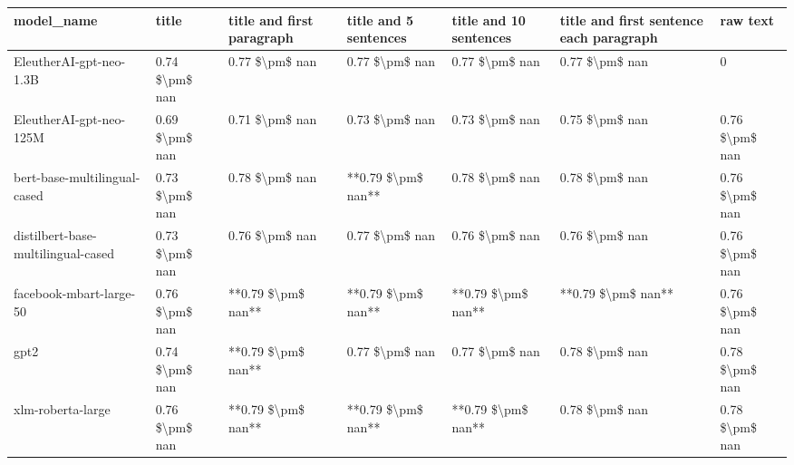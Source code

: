 \begin{tabular}{lllllll}
\toprule
                        model\_name &          title & title and first paragraph & title and 5 sentences & title and 10 sentences & title and first sentence each paragraph &       raw text \\
\midrule
           EleutherAI-gpt-neo-1.3B & 0.74 \$\textbackslash pm\$ nan &            0.77 \$\textbackslash pm\$ nan &        0.77 \$\textbackslash pm\$ nan &         0.77 \$\textbackslash pm\$ nan &                          0.77 \$\textbackslash pm\$ nan &              0 \\
           EleutherAI-gpt-neo-125M & 0.69 \$\textbackslash pm\$ nan &            0.71 \$\textbackslash pm\$ nan &        0.73 \$\textbackslash pm\$ nan &         0.73 \$\textbackslash pm\$ nan &                          0.75 \$\textbackslash pm\$ nan & 0.76 \$\textbackslash pm\$ nan \\
      bert-base-multilingual-cased & 0.73 \$\textbackslash pm\$ nan &            0.78 \$\textbackslash pm\$ nan &    **0.79 \$\textbackslash pm\$ nan** &         0.78 \$\textbackslash pm\$ nan &                          0.78 \$\textbackslash pm\$ nan & 0.76 \$\textbackslash pm\$ nan \\
distilbert-base-multilingual-cased & 0.73 \$\textbackslash pm\$ nan &            0.76 \$\textbackslash pm\$ nan &        0.77 \$\textbackslash pm\$ nan &         0.76 \$\textbackslash pm\$ nan &                          0.76 \$\textbackslash pm\$ nan & 0.76 \$\textbackslash pm\$ nan \\
           facebook-mbart-large-50 & 0.76 \$\textbackslash pm\$ nan &        **0.79 \$\textbackslash pm\$ nan** &    **0.79 \$\textbackslash pm\$ nan** &     **0.79 \$\textbackslash pm\$ nan** &                      **0.79 \$\textbackslash pm\$ nan** & 0.76 \$\textbackslash pm\$ nan \\
                              gpt2 & 0.74 \$\textbackslash pm\$ nan &        **0.79 \$\textbackslash pm\$ nan** &        0.77 \$\textbackslash pm\$ nan &         0.77 \$\textbackslash pm\$ nan &                          0.78 \$\textbackslash pm\$ nan & 0.78 \$\textbackslash pm\$ nan \\
                 xlm-roberta-large & 0.76 \$\textbackslash pm\$ nan &        **0.79 \$\textbackslash pm\$ nan** &    **0.79 \$\textbackslash pm\$ nan** &     **0.79 \$\textbackslash pm\$ nan** &                          0.78 \$\textbackslash pm\$ nan & 0.78 \$\textbackslash pm\$ nan \\
\bottomrule
\end{tabular}
